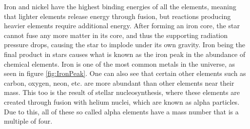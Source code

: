 \documentclass[english, oneside]{HYgradu}
\begin{document}
Iron and nickel have the highest binding energies of all the elements, meaning that lighter elements release energy through fusion, but reactions producing heavier elements require additional energy. After forming an iron core, the star cannot fuse any more matter in its core, and thus the supporting radiation pressure drops, causing the star to implode under its own gravity. Iron being the final product in stars causes what is known as the iron peak in the abundance of chemical elements. Iron is one of the most common metals in the universe, as seen in figure \ref{fig:IronPeak}. One can also see that certain other elements such as carbon, oxygen, neon, etc. are more abundant than other elements near their mass. This too is the result of stellar nucleosynthesis, where these elements are created through fusion with helium nuclei, which are known as alpha particles. Due to this, all of these so called alpha elements have a mass number that is a multiple of four.
\end{document}
